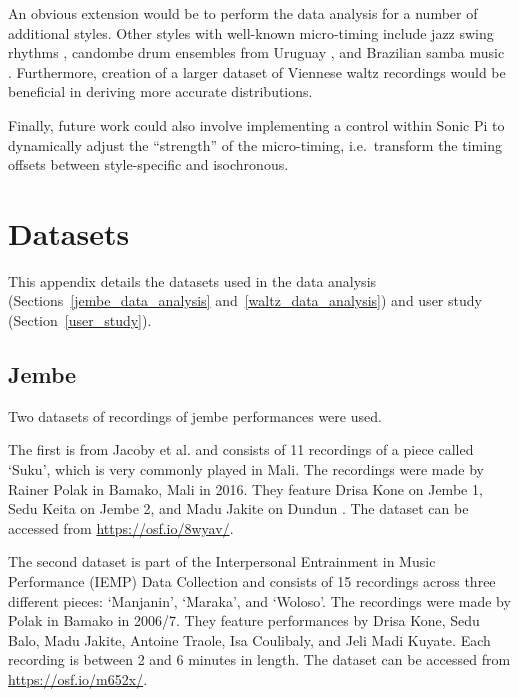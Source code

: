 \documentclass[12pt,twoside,openright]{report}
\begin{document}
An obvious extension would be to perform the data analysis for a number of
additional styles. Other styles with well-known micro-timing include jazz swing
rhythms \cite{dittmar2018}, candombe drum ensembles from Uruguay \cite{jure2016,fuentes2019}, and Brazilian samba music \cite{naveda2011,fuentes2019}. Furthermore,
creation of a larger dataset of Viennese waltz recordings would be beneficial in
deriving more accurate distributions.

Finally, future work could also involve implementing a control within Sonic Pi
to dynamically adjust the ``strength'' of the micro-timing, i.e.\ transform the
timing offsets between style-specific and isochronous.





\printbibliography[heading=bibintoc]





\appendix





\chapter{Datasets} \label{appendix_datasets}

This appendix details the datasets used in the data analysis (Sections~\ref{jembe_data_analysis} and~\ref{waltz_data_analysis}) and user study (Section~\ref{user_study}).



\section*{Jembe} \label{appendix_datasets_jembe}

Two datasets of recordings of jembe performances were used.

The first is from Jacoby et al. \cite{jacoby2021} and consists of 11 recordings of a piece called `Suku', which is very commonly played in Mali. The recordings were made by Rainer Polak in Bamako, Mali in 2016. They feature Drisa Kone on Jembe 1, Sedu Keita on Jembe 2, and Madu Jakite on Dundun \cite{jacoby2021supp}. The dataset can be accessed from \url{https://osf.io/8wyav/}.

The second dataset is part of the Interpersonal Entrainment in Music Performance (IEMP)
Data Collection \cite{polak2020,clayton2021} and consists of 15 recordings across three different pieces: `Manjanin', `Maraka', and `Woloso'. The recordings were made by Polak in Bamako in 2006/7. They feature performances by Drisa Kone, Sedu Balo, Madu Jakite, Antoine Traole, Isa Coulibaly, and Jeli Madi Kuyate. Each recording is between 2 and 6 minutes in length. The dataset can be accessed from \url{https://osf.io/m652x/}.
\end{document}
